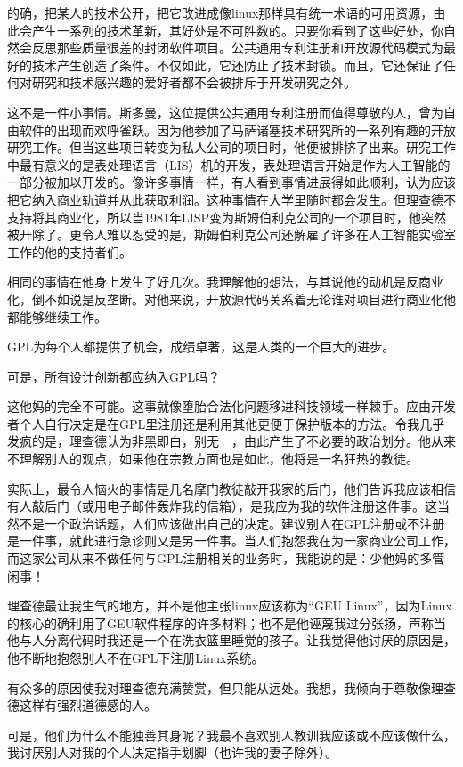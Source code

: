 的确，把某人的技术公开，把它改进成像linux那样具有统一术语的可用资源，由此会产生一系列的技术革新，其好处是不可胜数的。只要你看到了这些好处，你自然会反思那些质量很差的封闭软件项目。公共通用专利注册和开放源代码模式为最好的技术产生创造了条件。不仅如此，它还防止了技术封锁。而且，它还保证了任何对研究和技术感兴趣的爱好者都不会被排斥于开发研究之外。

这不是一件小事情。斯多曼，这位提供公共通用专利注册而值得尊敬的人，曾为自由软件的出现而欢呼雀跃。因为他参加了马萨诸塞技术研究所的一系列有趣的开放研究工作。但当这些项目转变为私人公司的项目时，他便被排挤了出来。研究工作中最有意义的是表处理语言（LIS）机的开发，表处理语言开始是作为人工智能的一部分被加以开发的。像许多事情一样，有人看到事情进展得如此顺利，认为应该把它纳入商业轨道并从此获取利润。这种事情在大学里随时都会发生。但理查德不支持将其商业化，所以当1981年LISP变为斯姆伯利克公司的一个项目时，他突然被开除了。更令人难以忍受的是，斯姆伯利克公司还解雇了许多在人工智能实验室工作的他的支持者们。

相同的事情在他身上发生了好几次。我理解他的想法，与其说他的动机是反商业化，倒不如说是反垄断。对他来说，开放源代码关系着无论谁对项目进行商业化他都能够继续工作。

GPL为每个人都提供了机会，成绩卓著，这是人类的一个巨大的进步。

可是，所有设计创新都应纳入GPL吗？

这他妈的完全不可能。这事就像堕胎合法化问题移进科技领域一样棘手。应由开发者个人自行决定是在GPL里注册还是利用其他更便于保护版本的方法。令我几乎发疯的是，理查德认为非黑即白，别无　，由此产生了不必要的政治划分。他从来不理解别人的观点，如果他在宗教方面也是如此，他将是一名狂热的教徒。

实际上，最令人恼火的事情是几名摩门教徒敲开我家的后门，他们告诉我应该相信有人敲后门（或用电子邮件轰炸我的信箱），是我应为我的软件注册这件事。这当然不是一个政治话题，人们应该做出自己的决定。建议别人在GPL注册或不注册是一件事，就此进行急诊则又是另一件事。当人们抱怨我在为一家商业公司工作，而这家公司从来不做任何与GPL注册相关的业务时，我能说的是：少他妈的多管闲事！

理查德最让我生气的地方，并不是他主张linux应该称为“GEU Linux”，因为Linux的核心的确利用了GEU软件程序的许多材料；也不是他诬蔑我过分张扬，声称当他与人分离代码时我还是一个在洗衣篮里睡觉的孩子。让我觉得他讨厌的原因是，他不断地抱怨别人不在GPL下注册Linux系统。

有众多的原因使我对理查德充满赞赏，但只能从远处。我想，我倾向于尊敬像理查德这样有强烈道德感的人。

可是，他们为什么不能独善其身呢？我最不喜欢别人教训我应该或不应该做什么，我讨厌别人对我的个人决定指手划脚（也许我的妻子除外）。

